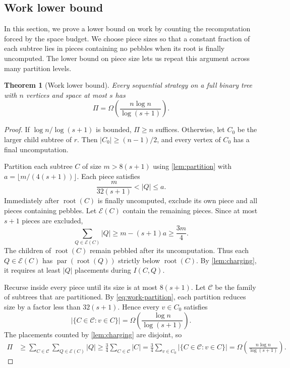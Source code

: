 \documentclass[11pt]{article}
\newtheorem{theorem}{Theorem}[section]
\theoremstyle{definition}
\theoremstyle{remark}
\DeclareMathOperator{\parv}{par}
\begin{document}
\subsection{Work lower bound}

In this section, we prove a lower bound on work by counting the recomputation forced by the space budget. We choose piece sizes so that a constant fraction of each subtree lies in pieces containing no pebbles when its root is finally uncomputed. The lower bound on piece size lets us repeat this argument across many partition levels.

\begin{theorem}[Work lower bound]
\label{thm:universal-work}
Every sequential strategy on a full binary tree with $n$ vertices and space at most $s$ has
\begin{equation}
\Pi=\Omega\!\left(\frac{n\log n}{\log(s+1)}\right).
\label{eq:universal-work}
\end{equation}
\end{theorem}
\begin{proof}
If $\log n/\log(s+1)$ is bounded, $\Pi\ge n$ suffices.
Otherwise, let $C_0$ be the larger child subtree of $r$.
Then $|C_0|\ge(n-1)/2$, and every vertex of $C_0$ has a final
uncomputation.

Partition each subtree $C$ of size $m>8(s+1)$ using
\cref{lem:partition} with $a=\lfloor m/(4(s+1))\rfloor$.
Each piece satisfies
\begin{equation}
 \frac{m}{32(s+1)}<|Q|\le a.
 \label{eq:work-partition}
\end{equation}
Immediately after $\operatorname{root}(C)$ is finally uncomputed, exclude
its own piece and all pieces containing pebbles.
Let $\mathcal E(C)$ contain the remaining pieces. Since at most
$s+1$ pieces are excluded,
\[
\sum_{Q\in\mathcal E(C)}|Q|
\ge m-(s+1)a\ge\frac{3m}{4}.
\]
The children of $\operatorname{root}(C)$ remain pebbled after
its uncomputation. Thus each $Q\in\mathcal E(C)$ has
$\parv(\operatorname{root}(Q))$ strictly below
$\operatorname{root}(C)$. By \cref{lem:charging}, it requires
at least $|Q|$ placements during $I(C,Q)$.

Recurse inside every piece until its size is at most $8(s+1)$.
Let $\mathcal C$ be the family of subtrees that are partitioned.
By \cref{eq:work-partition}, each partition reduces size by
a factor less than $32(s+1)$. Hence every $v\in C_0$ satisfies
\[
\bigl|\{C\in\mathcal C:v\in C\}\bigr|
=\Omega\!\left(\frac{\log n}{\log(s+1)}\right).
\]
The placements counted by \cref{lem:charging} are disjoint, so
\begin{align*}
\Pi
&\ge \sum_{C\in\mathcal C}\sum_{Q\in\mathcal E(C)}|Q|
\ge \frac34\sum_{C\in\mathcal C}|C|
 = \frac34\sum_{v\in C_0}
   \bigl|\{C\in\mathcal C:v\in C\}\bigr|
=\Omega\!\left(\frac{n\log n}{\log(s+1)}\right).
\end{align*}
\end{proof}
\end{document}
